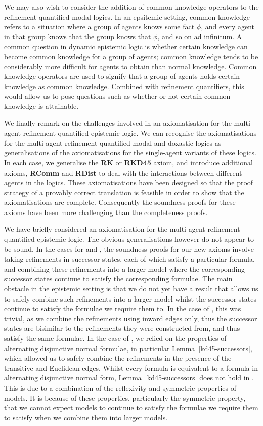 We may also wish to consider the addition of common knowledge operators to the
refinement quantified modal logics. In an epsitemic setting, common knowledge
refers to a situation where a group of agents knows some fact $\phi$, and every
agent in that group knows that the group knows that $\phi$, and so on ad
infinitum. A common question in dynamic epistemic logic is whether certain
knowledge can become common knowledge for a group of agents; common knowledge
tends to be considerably more difficult for agents to obtain than normal
knowledge. Common knowledge operators are used to signify that a group of agents
holds certain knowledge as common knowledge. Combined with refinement
quantifiers, this would allow us to pose questions such as whether or not
certain common knowledge is attainable.

We finally remark on the challenges involved in an axiomatisation for the
multi-agent refinement quantified epistemic logic. We can recognise the
axiomatisations for the multi-agent refinement quantified modal and doxastic
logics as generalisations of the axiomatisations for the single-agent variants
of these logics. In each case, we generalise the {\bf RK} or {\bf RKD45} axiom,
and introduce additional axioms, {\bf RComm} and {\bf RDist} to deal with the
interactions between different agents in the logics. These axiomatisations have
been designed so that the proof strategy of a provably correct translation is
feasible in order to show that the axiomatisations are complete. Consequently
the soundness proofs for these axioms have been more challenging than the
completeness proofs.

We have briefly considered an axiomatisation for the multi-agent refinement
quantified epistemic logic. The obvious generalisations however do not appear to
be sound. In the cases for \classK{} and \classKD{}, the soundness proofs for
our new axioms involve taking refinements in successor states, each of which
satisfy a particular formula, and combining these refinements into a larger
model where the corresponding successor states continue to satisfy the
corresponding formulae. The main obstacle in the epistemic setting is that we do
not yet have a result that allows us to safely combine such refinements into a
larger model whilst the successor states continue to satisfy the formulae we
require them to.  In the case of \classK{}, this was trivial, as we combine the
refinements using inward edges only, thus the successor states are bisimilar to
the refinements they were constructed from, and thus satisfy the same formulae.
In the case of \classKD{}, we relied on the properties of alternating
disjunctive normal formulae, in particular Lemma~\ref{kd45-successors}, which
allowed us to safely combine the refinements in the presence of the transitive
and Euclidean edges.  Whilst every \logicS{} formula is equivalent to a formula
in alternating disjunctive normal form, Lemma~\ref{kd45-successors} does not
hold in \logicS{}. This is due to a combination of the reflexivity and symmetric
properties of \classS{} models. It is because of these properties, particularly
the symmetric property, that we cannot expect models to continue to satisfy the
formulae we require them to satisfy when we combine them into larger models. 

